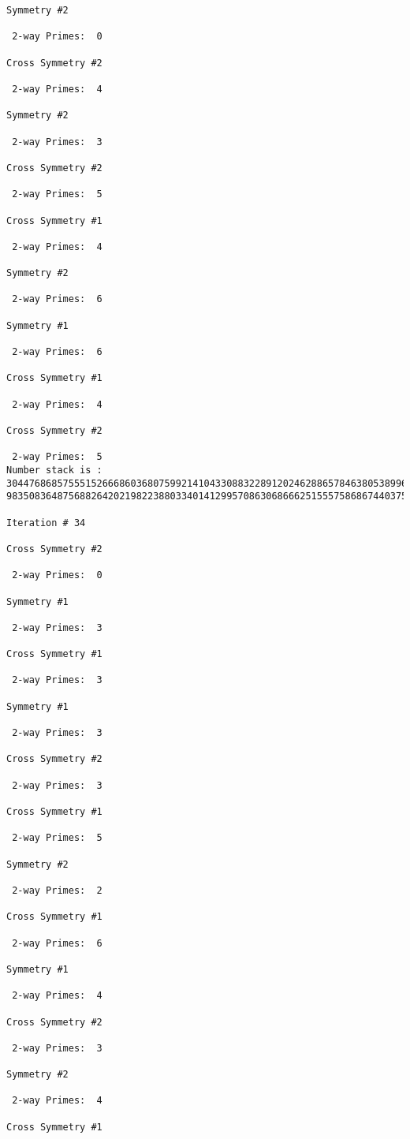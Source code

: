 {{{{\begin{verbatim}
Symmetry #2

 2-way Primes: 	0

Cross Symmetry #2

 2-way Primes: 	4

Symmetry #2

 2-way Primes: 	3

Cross Symmetry #2

 2-way Primes: 	5

Cross Symmetry #1

 2-way Primes: 	4

Symmetry #2

 2-way Primes: 	6

Symmetry #1

 2-way Primes: 	6

Cross Symmetry #1

 2-way Primes: 	4

Cross Symmetry #2

 2-way Primes: 	5
Number stack is :
30447686857555152666860368075992141043308832289120246288657846380538996794608835958544046240163340857
98350836487568826420219822388033401412995708630686662515557586867440375804336104264044585953880649769

Iteration #	34

Cross Symmetry #2

 2-way Primes: 	0

Symmetry #1

 2-way Primes: 	3

Cross Symmetry #1

 2-way Primes: 	3

Symmetry #1

 2-way Primes: 	3

Cross Symmetry #2

 2-way Primes: 	3

Cross Symmetry #1

 2-way Primes: 	5

Symmetry #2

 2-way Primes: 	2

Cross Symmetry #1

 2-way Primes: 	6

Symmetry #1

 2-way Primes: 	4

Cross Symmetry #2

 2-way Primes: 	3

Symmetry #2

 2-way Primes: 	4

Cross Symmetry #1


\end{verbatim}}}}}
